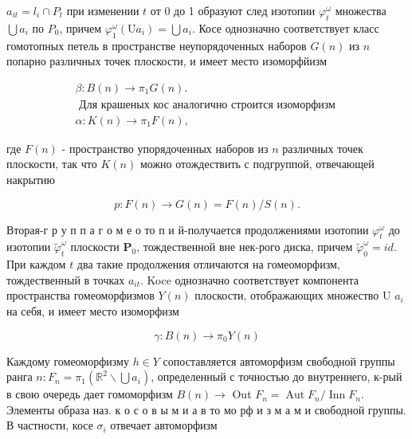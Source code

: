 \documentclass[10pt]{article}
\begin{document}
$a_{i t}=l_{i} \cap P_{t}$ при изменении $t$ от 0 до 1 образуют след изотопии $\varphi_{t}^{\omega}$ множества $\bigcup a_{i}$ по $P_{0}$, причем $\varphi_{1}^{\omega}\left(\mathrm{U} a_{i}\right)=\bigcup a_{i}$. Косе однозначно соответствует класс гомотопных петель в пространстве неупорядоченных наборов $G(n)$ из $n$ попарно различных точек плоскости, и имеет место изоморфйизм



\[

\begin{gathered}

\beta: B(n) \rightarrow \pi_{1} G(n) . \\

\text { Для крашеных кос аналогично строится изоморфизм } \\

\alpha: K(n) \rightarrow \pi_{1} F(n),

\end{gathered}

\]



где $F(n)$ - пространство упорядоченных наборов из $n$ различных точек плоскости, так что $K(n)$ можно отождествить с подгруппой, отвечающей накрытию



\[

p: F(n) \rightarrow G(n)=F(n) / S(n) .

\]



Вторая-г р у п п а г о м е о то п и й-получается продолжениями изотопии $\varphi_{t}^{\omega}$ до изотопии $\tilde{\varphi}_{t}^{\omega}$ плоскости $\boldsymbol{P}_{0}$, тождественной вне нек-рого диска, причем $\tilde{\varphi}_{0}^{\omega}=i d$. При каждом $t$ два такие продолжения отличаются на гомеоморфизм, тождественный в точках $a_{i t}$. Koce однозначно соответствует компонента пространства гомеоморфизмов $Y(n)$ плоскости, отображающих множество U $a_{i}$ на себя, и имеет место изоморфизм



\[

\gamma: B(n) \rightarrow \pi_{0} Y(n)

\]



Каждому гомеоморфизму $h \in Y$ сопоставляется автоморфизм свободной группы ранга $n: F_{n}=\pi_{1}\left(\mathbb{R}^{2} \backslash \bigcup a_{i}\right)$, определенный с точностью до внутреннего, к-рый в свою очередь дает гомоморфизм $B(n) \rightarrow$ Out $F_{n}=\operatorname{Aut} F_{n} / \operatorname{Inn} F_{n}$. Элементы образа наз. к о с о в ы м и а в то мо рф и з м а м и свободной группы. В частности, косе $\sigma_{i}$ отвечает автоморфизм
\end{document}
